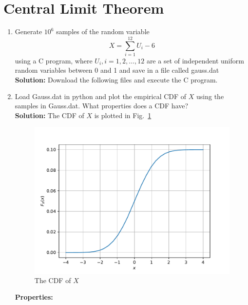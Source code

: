 \documentclass[12pt]{book}
\newcommand\figref{Fig.~\ref}
\newcommand{\solution}{\noindent \textbf{Solution: }}
\begin{document}
\section{Central Limit Theorem}
\begin{enumerate}

\item
Generate $10^6$ samples of the random variable
%
\begin{equation}
X = \sum_{i=1}^{12}U_i -6
\end{equation}
%
using a C program, where $U_i, i = 1,2,\dots, 12$ are  a set of independent uniform random variables between 0 and 1
and save in a file called gauss.dat\\
\solution Download the following files and execute the  C program.
\begin{center}
\end{center}
\item
Load Gauss.dat in python and plot the empirical CDF of $X$ using the samples in Gauss.dat. What properties does a CDF have?
\\
\solution The CDF of $X$ is plotted in \figref{fig:gauss_cdf}
\begin{figure}[H]
\centering
\includegraphics[width=\columnwidth]{./figs/2/2.2.2.pdf}
\caption{The CDF of $X$}
\label{fig:gauss_cdf}
\end{figure}
\textbf{Properties:}\\


\end{enumerate}
\end{document}
